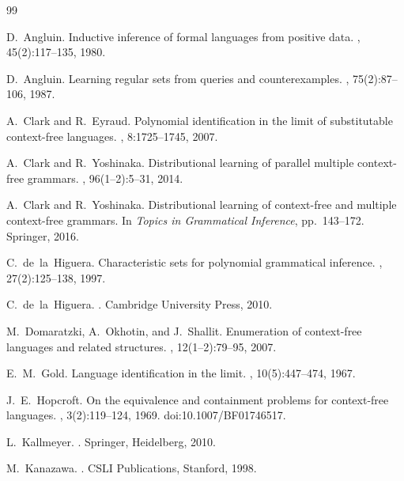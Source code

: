 \documentclass[11pt,a4paper]{ltjsarticle}
\theoremstyle{remark}
\begin{document}
\begin{thebibliography}{99}

D.~Angluin.
\newblock Inductive inference of formal languages from positive data.
, 45(2):117--135, 1980.

D.~Angluin.
\newblock Learning regular sets from queries and counterexamples.
, 75(2):87--106, 1987.

A.~Clark and R.~Eyraud.
\newblock Polynomial identification in the limit of substitutable context-free
languages.
, 8:1725--1745, 2007.

A.~Clark and R.~Yoshinaka.
\newblock Distributional learning of parallel multiple context-free grammars.
, 96(1--2):5--31, 2014.

A.~Clark and R.~Yoshinaka.
\newblock Distributional learning of context-free and multiple context-free
grammars.
\newblock In {\em Topics in Grammatical Inference}, pp.~143--172. Springer,
2016.

C.~de~la~Higuera.
\newblock Characteristic sets for polynomial grammatical inference.
, 27(2):125--138, 1997.

C.~de~la~Higuera.
.
\newblock Cambridge University Press, 2010.

M.~Domaratzki, A.~Okhotin, and J.~Shallit.
\newblock Enumeration of context-free languages and related structures.
,
12(1--2):79--95, 2007.

E.~M.~Gold.
\newblock Language identification in the limit.
, 10(5):447--474, 1967.

J.~E.~Hopcroft.
\newblock On the equivalence and containment problems for context-free
languages.
, 3(2):119--124, 1969.
\newblock doi:10.1007/BF01746517.

L.~Kallmeyer.
.
\newblock Springer, Heidelberg, 2010.

M.~Kanazawa.
.
\newblock CSLI Publications, Stanford, 1998.


\end{thebibliography}
\end{document}
